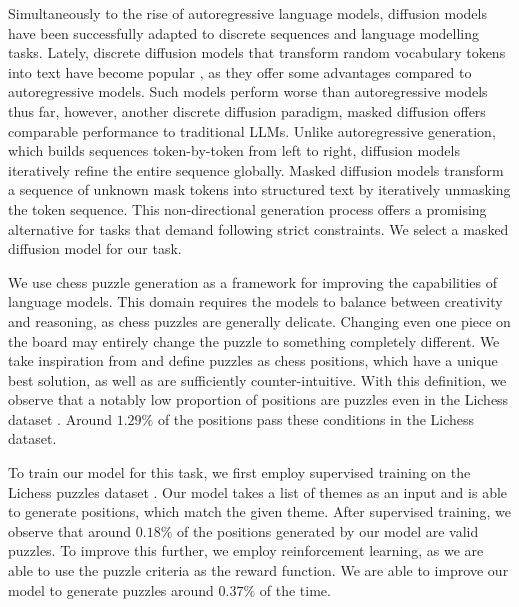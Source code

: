 \documentclass[letterpaper]{article} %
\begin{document}
Simultaneously to the rise of autoregressive language models, diffusion models have been successfully adapted to discrete sequences and language modelling tasks. Lately, discrete diffusion models that transform random vocabulary tokens into text have become popular \cite{diffusiongemma}, as they offer some advantages compared to autoregressive models. Such models perform worse than autoregressive models thus far, however, another discrete diffusion paradigm, masked diffusion \cite{austin2021structureddenoisingdiffusionmodels,nie2025largelanguagediffusionmodels} offers comparable performance to traditional LLMs. Unlike autoregressive generation, which builds sequences token-by-token from left to right, diffusion models iteratively refine the entire sequence globally. Masked diffusion models transform a sequence of unknown mask tokens into structured text by iteratively unmasking the token sequence. This non-directional generation process offers a promising alternative for tasks that demand following strict constraints. We select a masked diffusion model for our task.

We use chess puzzle generation as a framework for improving the capabilities of language models. This domain requires the models to balance between creativity and reasoning, as chess puzzles are generally delicate. Changing even one piece on the board may entirely change the puzzle to something completely different. We take inspiration from \cite{feng2025generatingcreativechesspuzzles} and define puzzles as chess positions, which have a unique best solution, as well as are sufficiently counter-intuitive. With this definition, we observe that a notably low proportion of positions are puzzles even in the Lichess dataset \cite{lichesspuzzledatabase}. Around $1.29\%$ of the positions pass these conditions in the Lichess dataset.

To train our model for this task, we first employ supervised training on the Lichess puzzles dataset \cite{lichesspuzzledatabase}. Our model takes a list of themes as an input and is able to generate positions, which match the given theme. After supervised training, we observe that around $0.18\%$ of the positions generated by our model are valid puzzles. To improve this further, we employ reinforcement learning, as we are able to use the puzzle criteria as the reward function. We are able to improve our model to generate puzzles around $0.37\%$ of the time.
\end{document}
